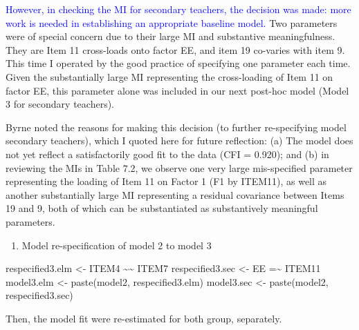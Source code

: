 \documentclass[
]{article}
\newenvironment{Shaded}{\begin{snugshade}}{\end{snugshade}}
\newcommand{\FunctionTok}[1]{\textcolor[rgb]{0.00,0.00,0.00}{#1}}
\newcommand{\NormalTok}[1]{#1}
\newcommand{\OtherTok}[1]{\textcolor[rgb]{0.56,0.35,0.01}{#1}}
\newcommand{\StringTok}[1]{\textcolor[rgb]{0.31,0.60,0.02}{#1}}
\providecommand{\tightlist}{%
  \setlength{\itemsep}{0pt}\setlength{\parskip}{0pt}}
\begin{document}
\textcolor{blue}{However, in checking the MI for secondary teachers, the decision was made: more work is needed in establishing an appropriate baseline model.} Two parameters were of special concern due to their large MI and substantive meaningfulness. They are Item 11 cross-loads onto factor EE, and item 19 co-varies with item 9. This time I operated by the good practice of specifying one parameter each time. Given the substantially large MI representing the cross-loading of Item 11 on factor EE, this parameter alone was included in our next post-hoc model (Model 3 for secondary teachers).

Byrne noted the reasons for making this decision (to further re-specifying model secondary teachers), which I quoted here for future reflection: (a) The model does not yet reflect a satisfactorily good fit to the data (CFI = 0.920); and (b) in reviewing the MIs in Table 7.2, we observe one very large mis-specified parameter representing the loading of Item 11 on Factor 1 (F1 by ITEM11), as well as another substantially large MI representing a residual covariance between Items 19 and 9, both of which can be substantiated as substantively meaningful parameters.

\begin{enumerate}
\def\labelenumi{(\arabic{enumi})}
\setcounter{enumi}{2}
\tightlist
\item
  Model re-specification of model 2 to model 3
\end{enumerate}

\begin{Shaded}
\begin{Highlighting}[]
\NormalTok{respecified3.elm }\OtherTok{\textless{}{-}} \StringTok{\textquotesingle{}ITEM4 \textasciitilde{}\textasciitilde{} ITEM7}
\StringTok{                     \textquotesingle{}}
\NormalTok{respecified3.sec }\OtherTok{\textless{}{-}} \StringTok{\textquotesingle{}EE =\textasciitilde{} ITEM11}
\StringTok{                     \textquotesingle{}}
\NormalTok{model3.elm }\OtherTok{\textless{}{-}} \FunctionTok{paste}\NormalTok{(model2, respecified3.elm)                 }
\NormalTok{model3.sec }\OtherTok{\textless{}{-}} \FunctionTok{paste}\NormalTok{(model2, respecified3.sec)}
\end{Highlighting}
\end{Shaded}

Then, the model fit were re-estimated for both group, separately.
\end{document}
